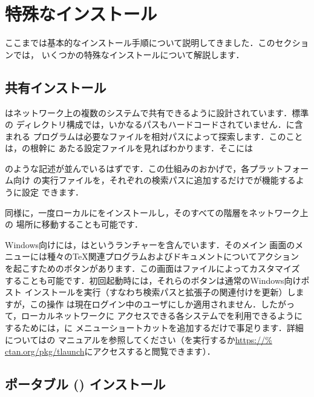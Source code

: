 \documentclass[uplatex,dvipdfmx]{jsarticle}
\begin{document}
\section{特殊なインストール}

ここまでは基本的なインストール手順について説明してきました．このセクションでは，
いくつかの特殊なインストールについて解説します．

\subsection{共有インストール}
\label{sec:sharedinstall}

\TL はネットワーク上の複数のシステムで共有できるように設計されています．標準の
ディレクトリ構成では，いかなるパスもハードコードされていません．\TL に含まれる
プログラムは必要なファイルを相対パスによって探索します．このことは，\TL の根幹に
あたる設定ファイルを見ればわかります．そこには
%
%
のような記述が並んでいるはずです．この仕組みのおかげで，各プラットフォーム向け
の実行ファイルを，それぞれの検索パスに追加するだけで\TL が機能するように設定
できます．

同様に，一度ローカルに\TL をインストールし，そのすべての階層をネットワーク上の
場所に移動することも可能です．

Windows向けには，\TL はというランチャーを含んでいます．そのメイン
画面のメニューには種々の\TeX 関連プログラムおよびドキュメントについてアクション
を起こすためのボタンがあります．この画面はファイルによってカスタマイズ
することも可能です．初回起動時には，それらのボタンは通常のWindows向けポスト
インストールを実行（すなわち検索パスと拡張子の関連付けを更新）しますが，この操作
は現在ログイン中のユーザにしか適用されません．したがって，ローカルネットワークに
アクセスできる各システムで\TL を利用できるようにするためには，に
メニューショートカットを追加するだけで事足ります．詳細についてはの
マニュアルを参照してください（を実行するか\url{https://%
ctan.org/pkg/tlaunch}にアクセスすると閲覧できます）．

\subsection{ポータブル (\USB) インストール}
\label{sec:portable-tl}
\end{document}
